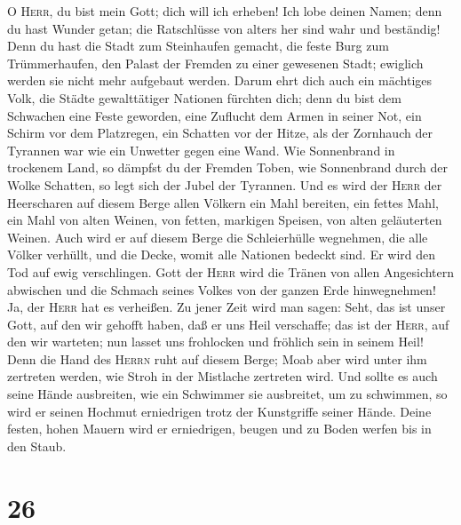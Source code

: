  O \textsc{Herr}, du bist mein Gott; dich will ich
erheben! Ich lobe deinen Namen; denn du hast Wunder getan; die
Ratschlüsse von alters her sind wahr und beständig!  Denn
du hast die Stadt zum Steinhaufen gemacht, die feste Burg zum
Trümmerhaufen, den Palast der Fremden zu einer gewesenen Stadt; ewiglich
werden sie nicht mehr aufgebaut werden.  Darum ehrt dich
auch ein mächtiges Volk, die Städte gewalttätiger Nationen fürchten
dich;  denn du bist dem Schwachen eine Feste geworden,
eine Zuflucht dem Armen in seiner Not, ein Schirm vor dem Platzregen,
ein Schatten vor der Hitze, als der Zornhauch der Tyrannen war wie ein
Unwetter gegen eine Wand.  Wie Sonnenbrand in trockenem
Land, so dämpfst du der Fremden Toben, wie Sonnenbrand durch der Wolke
Schatten, so legt sich der Jubel der Tyrannen.  Und es
wird der \textsc{Herr} der Heerscharen auf diesem Berge allen Völkern
ein Mahl bereiten, ein fettes Mahl, ein Mahl von alten Weinen, von
fetten, markigen Speisen, von alten geläuterten Weinen. 
Auch wird er auf diesem Berge die Schleierhülle wegnehmen, die alle
Völker verhüllt, und die Decke, womit alle Nationen bedeckt sind.
 Er wird den Tod auf ewig verschlingen. Gott der
\textsc{Herr} wird die Tränen von allen Angesichtern abwischen und die
Schmach seines Volkes von der ganzen Erde hinwegnehmen! Ja, der
\textsc{Herr} hat es verheißen.  Zu jener Zeit wird man
sagen: Seht, das ist unser Gott, auf den wir gehofft haben, daß er uns
Heil verschaffe; das ist der \textsc{Herr}, auf den wir warteten; nun
lasset uns frohlocken und fröhlich sein in seinem Heil! 
Denn die Hand des \textsc{Herrn} ruht auf diesem Berge; Moab aber wird
unter ihm zertreten werden, wie Stroh in der Mistlache zertreten wird.
 Und sollte es auch seine Hände ausbreiten, wie ein
Schwimmer sie ausbreitet, um zu schwimmen, so wird er seinen Hochmut
erniedrigen trotz der Kunstgriffe seiner Hände.  Deine
festen, hohen Mauern wird er erniedrigen, beugen und zu Boden werfen bis
in den Staub.

\hypertarget{section-25}{%
\section{26}\label{section-25}}

